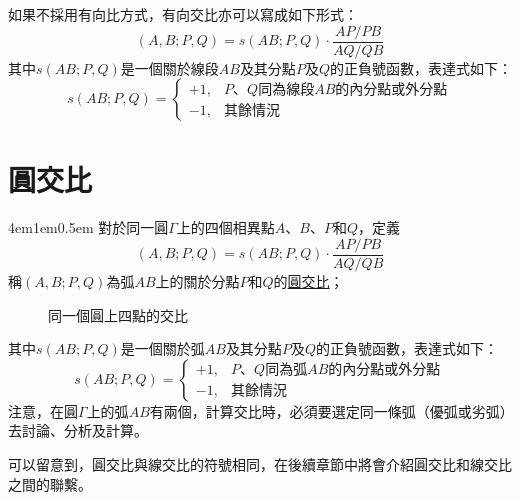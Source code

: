 \documentclass[12pt]{article}
\begin{document}
如果不採用有向比方式，有向交比亦可以寫成如下形式：
$$
    \left(A,B;P,Q\right)=s\left(AB;P,Q\right)\cdot\frac{AP/PB}{AQ/QB}
$$
其中$s\left(AB;P,Q\right)$是一個關於線段$AB$及其分點$P$及$Q$的正負號函數，表達式如下：
$$
    s\left(AB;P,Q\right)=\left\{\begin{matrix}
        +1,&P\text{、}Q\text{同為線段}AB\text{的內分點或外分點}\\
        -1,&\text{其餘情況}
    \end{matrix}\right.
$$
\section{圓交比}
\begin{mybox}[定義]{4em}{1em}{0.5em}
    對於同一圓$\Gamma$上的四個相異點$A$、$B$、$P$和$Q$，定義
    $$
        \left(A,B;P,Q\right)=s\left(AB;P,Q\right)\cdot\frac{AP/PB}{AQ/QB}
    $$
    稱$\left(A,B;P,Q\right)$為弧$AB$上的關於分點$P$和$Q$的\underline{圓交比}；
    \begin{figure}[H]
        \centering
        \label{fig:cr_circle}
        \caption{同一個圓上四點的交比}
    \end{figure}
    其中$s\left(AB;P,Q\right)$是一個關於弧$AB$及其分點$P$及$Q$的正負號函數，表達式如下：
    $$
        s\left(AB;P,Q\right)=\left\{\begin{matrix}
            +1,&P\text{、}Q\text{同為弧}AB\text{的內分點或外分點}\\
            -1,&\text{其餘情況}
        \end{matrix}\right.
    $$
    注意，在圓$\Gamma$上的弧$AB$有兩個，計算交比時，必須要選定同一條弧（優弧或劣弧）去討論、分析及計算。
\end{mybox}
可以留意到，圓交比與線交比的符號相同，在後續章節中將會介紹圓交比和線交比之間的聯繫。
\end{document}
